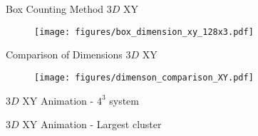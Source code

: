 \documentclass[10pt]{beamer}
\begin{document}
\begin{frame}{Box Counting Method $3D$ XY}
    \begin{figure}[h!]
        \centering
            \texttt{[image: figures/box\_dimension\_xy\_128x3.pdf]}
    \end{figure}
\end{frame}

\begin{frame}{Comparison of Dimensions $3D$ XY}
    \begin{figure}[h!]
        \centering
            \texttt{[image: figures/dimenson\_comparison\_XY.pdf]}
    \end{figure}
\end{frame}


\begin{frame}{$3D$ XY Animation - $4^3$ system}
\end{frame}

\begin{frame}{$3D$ XY Animation - Largest cluster}
\end{frame}
\end{document}
